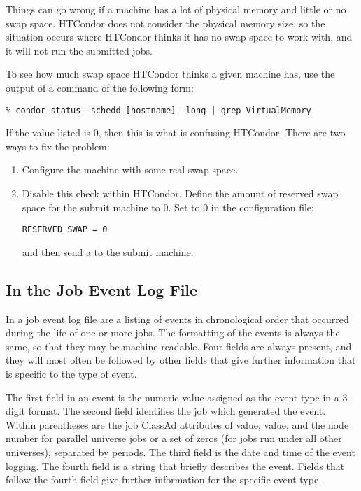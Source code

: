 Things can go wrong if a machine has a lot of physical memory and
little or no swap space.
HTCondor does not consider the physical memory size,
so the situation occurs where HTCondor thinks
it has no swap space to work with,
and it will not run the submitted jobs.

To see how much swap space HTCondor thinks a given machine has, use
the output of a  command of the following form:

\footnotesize
\begin{verbatim}
% condor_status -schedd [hostname] -long | grep VirtualMemory
\end{verbatim}
\normalsize
If the value listed is 0, then this is what is confusing HTCondor.
There are two ways to fix the problem:

\begin{enumerate}
\item Configure the machine with some real swap space.

\item Disable this check within HTCondor.
Define the amount of reserved swap space for the submit machine to 0.
Set  to 0 in the configuration file:

\begin{verbatim}
RESERVED_SWAP = 0
\end{verbatim}

and then send a  to the submit machine.
\end{enumerate}



\subsection{\label{sec:job-log-events}In the Job Event Log File}
In a job event log file are a listing of events in
chronological order that occurred during the life of one or more jobs.
The formatting of the events is always the same, 
so that they may be machine readable.
Four fields are always present,
and they will most often be followed by other fields that give further
information that is specific to the type of event.

The first field in an event is the numeric value assigned as the
event type in a 3-digit format.
The second field identifies the job which generated the event. 
Within parentheses are the job ClassAd attributes of
 value, 
 value, 
and the node number  for parallel universe jobs or a set of zeros
(for jobs run under all other universes),
separated by periods.
The third field is the date and time of the event logging.  
The fourth field is a string that briefly describes the event.
Fields that follow the fourth field give further information for the specific
event type.

